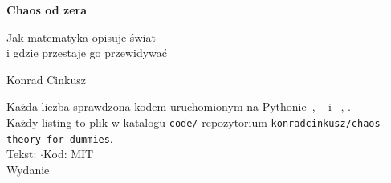 \thispagestyle{empty}
\begin{center}
\vspace*{3.0cm}

{\Huge\bfseries\color{mblue} Chaos od zera}

\vspace{1.0cm}
{\Large\color{mgrey} Jak matematyka opisuje świat\\[4pt]
i gdzie przestaje go przewidywać}

\vspace{2.4cm}
{\large Konrad Cinkusz}

\vfill
{\small\color{mgrey}
Każda liczba sprawdzona kodem uruchomionym na Pythonie~\pypatch,
~\numpyver{} i ~\matplotlibver, \pinnedon.\\[4pt]
Każdy listing to plik w katalogu \texttt{code/} repozytorium
\texttt{konradcinkusz/chaos-theory-for-dummies}.\\[10pt]
Tekst: \proselicence{} \quad$\cdot$\quad Kod: MIT\\[4pt]
Wydanie \bookedition}

\vspace{1.2cm}
\end{center}
\clearpage
